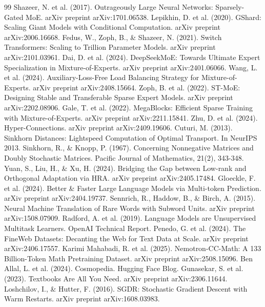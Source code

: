 \documentclass[11pt,twocolumn]{article}
\begin{document}
\begin{thebibliography}{99}
 Shazeer, N. et al. (2017). Outrageously Large Neural Networks: Sparsely-Gated MoE. arXiv preprint arXiv:1701.06538.
 Lepikhin, D. et al. (2020). GShard: Scaling Giant Models with Conditional Computation. arXiv preprint arXiv:2006.16668.
 Fedus, W., Zoph, B., \& Shazeer, N. (2021). Switch Transformers: Scaling to Trillion Parameter Models. arXiv preprint arXiv:2101.03961.
 Dai, D. et al. (2024). DeepSeekMoE: Towards Ultimate Expert Specialization in Mixture-of-Experts. arXiv preprint arXiv:2401.06066.
 Wang, L. et al. (2024). Auxiliary-Loss-Free Load Balancing Strategy for Mixture-of-Experts. arXiv preprint arXiv:2408.15664.
 Zoph, B. et al. (2022). ST-MoE: Designing Stable and Transferable Sparse Expert Models. arXiv preprint arXiv:2202.08906.
 Gale, T. et al. (2022). MegaBlocks: Efficient Sparse Training with Mixture-of-Experts. arXiv preprint arXiv:2211.15841.
 Zhu, D. et al. (2024). Hyper-Connections. arXiv preprint arXiv:2409.19606.
 Cuturi, M. (2013). Sinkhorn Distances: Lightspeed Computation of Optimal Transport. In NeurIPS 2013.
 Sinkhorn, R., \& Knopp, P. (1967). Concerning Nonnegative Matrices and Doubly Stochastic Matrices. Pacific Journal of Mathematics, 21(2), 343-348.
 Yuan, S., Liu, H., \& Xu, H. (2024). Bridging the Gap between Low-rank and Orthogonal Adaptation via HRA. arXiv preprint arXiv:2405.17484.
 Gloeckle, F. et al. (2024). Better \& Faster Large Language Models via Multi-token Prediction. arXiv preprint arXiv:2404.19737.
 Sennrich, R., Haddow, B., \& Birch, A. (2015). Neural Machine Translation of Rare Words with Subword Units. arXiv preprint arXiv:1508.07909.
 Radford, A. et al. (2019). Language Models are Unsupervised Multitask Learners. OpenAI Technical Report.
 Penedo, G. et al. (2024). The FineWeb Datasets: Decanting the Web for Text Data at Scale. arXiv preprint arXiv:2406.17557.
 Karimi Mahabadi, R. et al. (2025). Nemotron-CC-Math: A 133 Billion-Token Math Pretraining Dataset. arXiv preprint arXiv:2508.15096.
 Ben Allal, L. et al. (2024). Cosmopedia. Hugging Face Blog.
 Gunasekar, S. et al. (2023). Textbooks Are All You Need. arXiv preprint arXiv:2306.11644.
 Loshchilov, I., \& Hutter, F. (2016). SGDR: Stochastic Gradient Descent with Warm Restarts. arXiv preprint arXiv:1608.03983.

\end{thebibliography}
\end{document}
